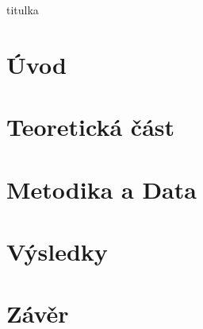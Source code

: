 \documentclass[12pt,a4paper]{report}
\begin{document}
{titulka}

\chapter*{Úvod}


\chapter{Teoretická část}


\chapter{Metodika a Data}


\chapter{Výsledky}


\chapter*{Závěr}


\begin{abstract}
    \noindent Práce se zabývá problematikou odhadu rozptylu výběrových kvantilů, což je nelineární statistika, u které nelze použít standardní vzorce pro výběrový průměr. Představena je metoda Taylorovy linearizace ve formě Woodruffovy metody intervalové inverze, která umožňuje obejít nutnost přímého odhadu hustoty pravděpodobnosti. Teoretické poznatky jsou ověřeny v simulační studii na log-normálním rozdělení, která zkoumá vliv šikmosti rozdělení na pokrytí intervalů spolehlivosti. Výsledky ukazují, že zatímco pro medián je metoda robustní i při menších rozsazích výběru, pro krajní kvantily u sešikmených dat vyžaduje značně větší výběrové soubory k dosažení asymptotických vlastností.
    
    \vspace{1em}
    \noindent \textbf{Klíčová slova:} Výběrový kvantil, Taylorova linearizace, Woodruffova metoda, Log-normální rozdělení, Simulace.
    
    \noindent \textbf{JEL Classification:} C10, C42, C83.
\end{abstract}

\newpage

\printbibliography[title={Použitá literatura},heading={bibintoc}]
\end{document}
